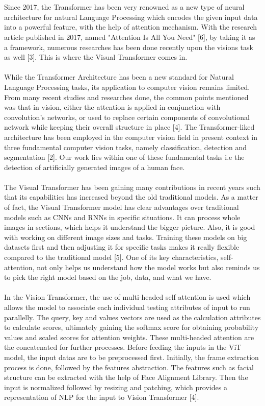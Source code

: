 \\\\
Since 2017, the Transformer has been very renowned as a new type of neural architecture for natural Language Processing which encodes the given input data into a powerful feature, with the help of attention mechanism.  With the research article published in 2017, named "Attention Is All You Need" [6], by taking it as a framework, numerous researches has been done recently upon the visions task as well [3]. This is where the Visual Transformer comes in. 
\\\\
While the Transformer Architecture has been a new standard for Natural Language Processing tasks, its application to computer vision remains limited. From many recent studies and researches done, the common points mentioned was that in vision, either the attention is applied in conjunction with convolution's networks, or used to replace certain components of convolutional network while keeping their overall structure in place [4].
The Transformer-liked architecture has been employed in the computer vision field in present context in three fundamental computer vision tasks, namely classification, detection and segmentation [2]. Our work lies within one of these fundamental tasks i.e the detection of artificially generated images of a human face.
\\\\
 The Visual Transformer has been gaining many contributions in recent years such that its capabilities has increased beyond the old traditional models. As a matter of fact, the Visual Transformer model has clear advantages over traditional models such as CNNs and RNNs in specific situations. It can process whole images in sections, which helps it understand the bigger picture. Also, it is good with working on different image sizes and tasks. 
 Training these models on big datasets first and then adjusting it for specific tasks makes it really flexible compared to the traditional model [5]. One of its key characteristics, self-attention, not only helps us understand how the model works but also reminds us to pick the right model based on the job, data, and what we have.
\\\\
In the Vision Transformer, the use of multi-headed self attention is used which allows the model to associate each individual testing attributes of input to run parallelly. The query, key and values vectors are used as the calculation attributes to calculate scores, ultimately gaining the softmax score for obtaining probability values and scaled scores for attention weights. These multi-headed attention are the concatenated for further processes. Before feeding the inputs in the ViT model, the input datas are to be preprocessed first. Initially, the frame extraction process is done, followed by the features abstraction. The features such as facial structure can be extracted with the help of Face Alignment Library. Then the input is normalized followed by resizing and patching, which provides a representation of NLP for the input to Vision Transformer [4].
